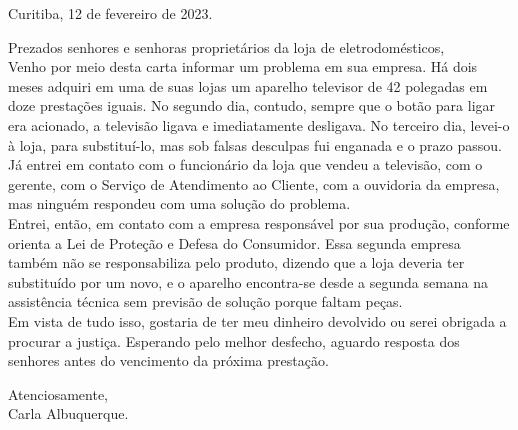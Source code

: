 \begin{conteudo}
\begin{conteudo}
{\begin{flushright}
Curitiba, 12 de fevereiro de 2023.\\
\end{flushright}

Prezados senhores e senhoras proprietários da loja de eletrodomésticos,\\

Venho por meio desta carta informar um problema em sua empresa. Há dois meses adquiri em uma de suas lojas um aparelho televisor de 42 polegadas em doze prestações iguais. No segundo dia, contudo, sempre que o botão para ligar era acionado, a televisão ligava e imediatamente desligava. No terceiro dia, levei-o à loja, para substituí-lo, mas sob falsas desculpas fui enganada e o prazo passou.\\

Já entrei em contato com o funcionário da loja que vendeu a televisão, com o gerente, com o Serviço de Atendimento ao Cliente, com a ouvidoria da empresa, mas ninguém respondeu com uma solução do problema.\\

Entrei, então, em contato com a empresa responsável por sua produção, conforme orienta a Lei de Proteção e Defesa do Consumidor. Essa segunda empresa também não se responsabiliza pelo produto, dizendo que a loja deveria ter substituído por um novo, e o aparelho encontra-se desde a segunda semana na assistência técnica sem previsão de solução porque faltam peças.\\

Em vista de tudo isso, gostaria de ter meu dinheiro devolvido ou serei obrigada a procurar a justiça. Esperando pelo melhor desfecho, aguardo resposta dos senhores antes do vencimento da próxima prestação.\\

\begin{flushright}
Atenciosamente,\\

Carla Albuquerque.
\end{flushright}
}

\end{conteudo}
\end{conteudo}
